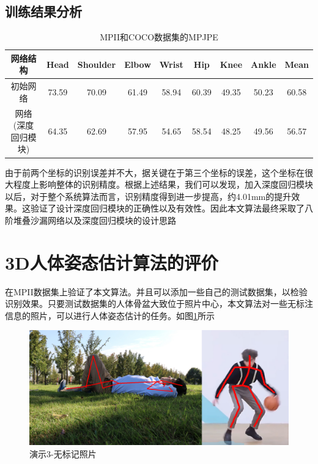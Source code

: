 \subsection{训练结果分析}

\begin{table}[]
    \centering
    \begin{tabular}{c|c|c|c|c|c|c|c|c}
        \hline
         网络结构 & Head & Shoulder	& Elbow	& Wrist	& Hip & Knee & Ankle & Mean\\
        \hline
         初始网络 & 73.59 & 70.09 & 61.49 & 58.94 & 60.39 & 49.35 & 50.23 & 60.58\\
        \hline
         网络(深度回归模块) & 64.35 & 62.69 & 57.95 & 54.65 & 58.54 & 48.25 & 49.56 & 56.57\\
        \hline
    \end{tabular}
    \caption{MPII和COCO数据集的MPJPE}
    \label{depth_hg}
\end{table}

由于前两个坐标的识别误差并不大，据关键在于第三个坐标的误差，这个坐标在很大程度上影响整体的识别精度。根据上述结果，我们可以发现，加入深度回归模块以后，对于整个系统算法而言，识别精度得到进一步提高，约4.01mm的提升效果。这验证了设计深度回归模块的正确性以及有效性。因此本文算法最终采取了八阶堆叠沙漏网络以及深度回归模块的设计思路

\section{3D人体姿态估计算法的评价}

在MPII数据集上验证了本文算法。并且可以添加一些自己的测试数据集，以检验识别效果。只要测试数据集的人体骨盆大致位于照片中心，本文算法对一些无标注信息的照片，可以进行人体姿态估计的任务。如图\ref{vs_3}所示

\begin{figure}[h]
	\includegraphics[width=\textwidth]{pic/vs_3.jpg}
	\caption{演示3-无标记照片}
	\label{vs_3}
\end{figure}

